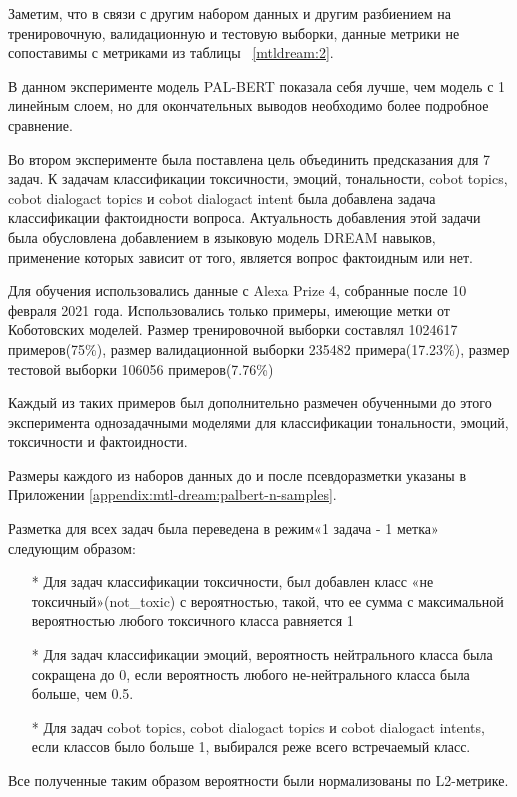 Заметим, что в связи с другим набором данных и другим разбиением на тренировочную, валидационную и тестовую выборки, данные метрики не сопоставимы с метриками из таблицы ~\ref{mtldream:2}.
 
В данном эксперименте модель PAL-BERT показала себя лучше, чем модель с 1 линейным слоем, но для окончательных выводов необходимо более подробное сравнение.

Во втором эксперименте была поставлена цель объединить предсказания для 7 задач. К задачам классификации токсичности, эмоций, тональности, cobot topics, cobot dialogact topics и cobot dialogact intent была добавлена задача классификации фактоидности вопроса. Актуальность добавления этой задачи была обусловлена добавлением в языковую модель {DREAM} навыков, применение которых зависит от того, является вопрос фактоидным или нет.

Для обучения использовались данные с Alexa Prize 4, собранные после 10 февраля 2021 года. Использовались только примеры, имеющие метки от Коботовских моделей. Размер тренировочной выборки составлял 1024617 примеров(75\%), размер валидационной выборки 235482 примера(17.23\%), размер тестовой выборки 106056 примеров(7.76\%)

Каждый из таких примеров был дополнительно размечен обученными до этого эксперимента однозадачными моделями для классификации тональности, эмоций, токсичности и фактоидности.

Размеры каждого из наборов данных до и после псевдоразметки указаны в Приложении \ref{appendix:mtl-dream:palbert-n-samples}. 

Разметка для всех задач была переведена в режим«1 задача - 1 метка» следующим образом:
\begin{itemize}
\item[*] Для задач классификации токсичности, был добавлен класс «не токсичный»({not\_toxic}) с вероятностью, такой, что ее сумма с максимальной вероятностью любого токсичного класса равняется 1
\item[*] Для задач классификации эмоций, вероятность нейтрального класса была сокращена до 0, если вероятность любого не-нейтрального класса была больше, чем 0.5.
\item[*] Для задач cobot topics, cobot dialogact topics и cobot dialogact intents, если классов было больше 1, выбирался реже всего встречаемый класс.
\end{itemize}
Все полученные таким образом вероятности были нормализованы по L2-метрике.

